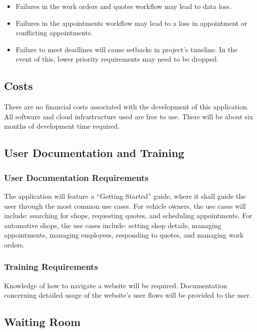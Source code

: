 \documentclass[12pt]{article}
\begin{document}
\begin{itemize}
	\item Failures in the work orders and quotes workflow may lead to data loss.
	\item Failures in the appointments workflow may lead to a loss in appointment or conflicting
	      appointments.
	\item Failure to meet deadlines will cause setbacks in project's timeline. In the event of this, lower
	      priority requirements may need to be dropped.
\end{itemize}

\subsection{Costs}

There are no financial costs associated with the development of this application. All software and
cloud infrastructure used are free to use. There will be about six months of development time
required.

\subsection{User Documentation and Training}
\subsubsection{User Documentation Requirements}

The application will feature a ``Getting Started'' guide, where it shall guide the user through the
most common use cases. For vehicle owners, the use cases will include: searching for shops,
requesting quotes, and scheduling appointments. For automotive shops, the use cases include:
setting shop details, managing appointments, managing employees, responding to quotes, and managing
work orders.

\subsubsection{Training Requirements}

Knowledge of how to navigate a website will be required. Documentation concerning detailed usage of
the website's user flows will be provided to the user.

\subsection{Waiting Room}
\end{document}
